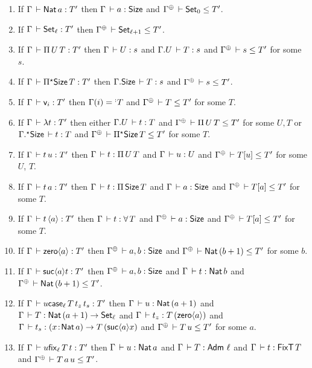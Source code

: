 \documentclass[acmlarge,review,anonymous]{acmart}\settopmatter{printfolios=true}
\newcommand{\LONGVERSION}[1]{}
\begin{document}
\LONGVERSION{
\begin{corollary}[Partial resurrection for substitution equality]
  If\/ $\sueq \Gamma \sigma {\sigma'} {\tau} \Delta$ then
  $\sueq {\resurrect \Gamma} \tau \tau \tau {\resurrect \Delta}$.
\end{corollary}
}

\begin{lemma}
\label{lem:invty} \bla
\begin{enumerate}
\item If\/ $\Gamma \der \Nat a : T'$ then $\Gamma \der a : \Size$ and $\resurrect\Gamma \der \Set[0] \leq T'$.
\item If\/ $\Gamma \der \Set[\ell] : T'$ then $\resurrect\Gamma \der \Set[\ell+1] \leq T'$.
\item If\/ $\Gamma \der \piT U T : T'$ then $\Gamma \der U : s$ and $\cext \Gamma U \der T : s$ and $\resurrect\Gamma \der s \leq T'$ for some $s$.
\item If\/ $\Gamma \der \epiT \Size T : T'$ then $\cext\Gamma \Size \der T : s$ and $\resurrect\Gamma \der s \leq T'$.
\item If\/ $\Gamma \der \ind i : T'$ then $\Gamma(i) = \erann[\noterased] T$ and $\resurrect\Gamma \der T \leq T'$ for some $T$.
\item If\/ $\Gamma \der \lambda t : T'$ then either
  $\cext \Gamma U \der t : T$
  and
  $\resurrect\Gamma \der \piT U T \leq T'$
  for some $U,T$ or
  $\eext \Gamma \Size \der t : T$
  and
  $\resurrect\Gamma \der \epiT\Size T \leq T'$
  for some $T$.
\item If\/ $\Gamma \der t\,u : T'$ then $\Gamma \der t : \piT U T$ and $\Gamma \der u : U$ and $\resurrect\Gamma \der T[u] \leq T'$ for some $U$, $T$.
\item If\/ $\Gamma \der t\,a : T'$ then $\Gamma \der t : \piT \Size T$ and $\Gamma \der a : \Size$ and $\resurrect\Gamma \der T[a] \leq T'$ for some $T$.
\item If\/ $\Gamma \der t\,\ann a : T'$ then $\Gamma \der t : \forallT T$ and $\resurrect\Gamma \der a : \Size$ and $\resurrect\Gamma \der T[a] \leq T'$ for some $T$.
\item If\/ $\Gamma \der \zero a : T'$ then $\resurrect \Gamma \der a,b : \Size$ and $\resurrect\Gamma \der \Nat (b + 1) \leq T'$ for some $b$.
\item If\/ $\Gamma \der \suc a t : T'$ then $\resurrect \Gamma \der a,b : \Size$ and $\Gamma \der t : \Nat b$ and $\resurrect\Gamma \der \Nat(b+1) \leq T'$.
\item If\/ $\Gamma \der u \case[\ell] T {t_z} {t_s} : T'$ then $\Gamma \der u : \Nat (a+1)$ and $\Gamma \der T : \Nat(a+1) \to \Set[\ell]$ and $\Gamma \der t_z : T\,(\zero a)$ and $\Gamma \der t_s : \funT x {\Nat a} {T\,(\suc a x)}$ and $\resurrect\Gamma \der T\,u \leq T'$ for some $a$.
\item If\/ $\Gamma \der u \fix[\ell] T t : T'$ then $\Gamma \der u : \Nat a$ and $\Gamma \der T : \Adm\,\ell$ and $\Gamma \der t : \FixT\,T$ and $\resurrect\Gamma \der T\,a\,u \leq T'$.
\end{enumerate}
\end{lemma}
\end{document}
